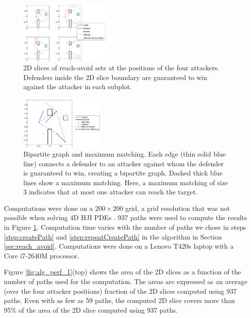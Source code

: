 \begin{figure}[H]
	\centering
	\includegraphics[width=0.4\textwidth]{"fig/fixed attacker PD 1"}
	\caption{2D slices of reach-avoid sets at the positions of the four attackers. Defenders  inside the 2D slice boundary are guaranteed to win against the attacker in each subplot.}
	\label{fig:fixed_a_1}
\end{figure}

\begin{figure}[H]
	\centering
	\includegraphics[width=0.375\textwidth]{"fig/max matching PD 1"}
	\caption{Bipartite graph and maximum matching. Each edge (thin solid blue line) connects a defender to an attacker against whom the defender is guaranteed to win, creating a bipartite graph. Dashed thick blue lines show a maximum matching. Here, a maximum matching of size 3 indicates that at most one attacker can reach the target.}
	\label{fig:max_matching_1}
\end{figure}

Computations were done on a $200\times200$ grid, a grid resolution that was not possible when solving 4D HJI PDEs \cite{Chen2014}. 937 paths were used to compute the results in Figure \ref{fig:fixed_a_1}. Computation time varies with the number of paths we chose in steps \ref{step:createPath} and \ref{step:repeatCreatePath} in the algorithm in Section \ref{sec:reach_avoid}. Computations were done on a Lenovo T420s laptop with a Core i7-2640M processor.  %

Figure \ref{fig:alg_perf_1}(top) shows the area of the 2D slices as a function of the number of paths used for the computation. The areas are expressed as an average (over the four attacker positions) fraction of the 2D slices computed using 937 paths. Even with as few as 59 paths, the computed 2D slice covers more than 95\% of the area of the 2D slice computed using 937 paths.

